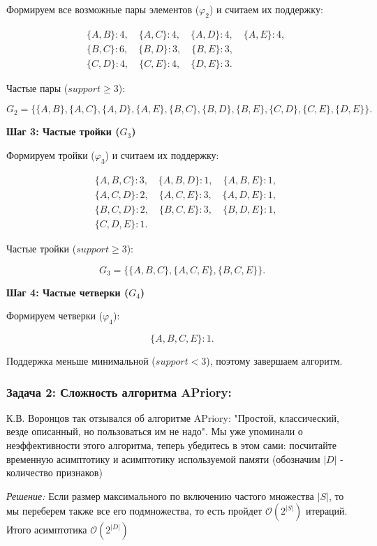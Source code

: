Формируем все возможные пары элементов (\( \varphi_2 \)) и считаем их поддержку:

\[
\begin{aligned}
&\{A, B\}: 4, \quad \{A, C\}: 4, \quad \{A, D\}: 4, \quad \{A, E\}: 4, \\
&\{B, C\}: 6, \quad \{B, D\}: 3, \quad \{B, E\}: 3, \\
&\{C, D\}: 4, \quad \{C, E\}: 4, \quad \{D, E\}: 3.
\end{aligned}
\]

Частые пары (\( support \geq 3 \)):

\[
G_2 = \{\{A, B\}, \{A, C\}, \{A, D\}, \{A, E\}, \{B, C\}, \{B, D\}, \{B, E\}, \{C, D\}, \{C, E\}, \{D, E\}\}.
\]

\textbf{Шаг 3: Частые тройки (\( G_3 \))}

Формируем тройки (\( \varphi_3 \)) и считаем их поддержку:

\[
\begin{aligned}
&\{A, B, C\}: 3, \quad \{A, B, D\}: 1, \quad \{A, B, E\}: 1, \\
&\{A, C, D\}: 2, \quad \{A, C, E\}: 3, \quad \{A, D, E\}: 1, \\
&\{B, C, D\}: 2, \quad \{B, C, E\}: 3, \quad \{B, D, E\}: 1, \\
&\{C, D, E\}: 1.
\end{aligned}
\]

Частые тройки (\( support \geq 3 \)):

\[
G_3 = \{\{A, B, C\}, \{A, C, E\}, \{B, C, E\}\}.
\]

\textbf{Шаг 4: Частые четверки (\( G_4 \))}

Формируем четверки (\( \varphi_4 \)):

\[
\{A, B, C, E\}: 1.
\]

Поддержка меньше минимальной (\( support < 3 \)), поэтому завершаем алгоритм.

\subsubsection{Задача 2: Сложность алгоритма APriory:} К.В. Воронцов так отзывался об алгоритме APriory: "Простой, классический, везде описанный, но пользоваться им не надо". Мы уже упоминали о неэффективности этого алгоритма, теперь убедитесь в этом сами: посчитайте временную асимптотику и асимптотику используемой памяти (обозначим \(|D|\) - количество признаков)


\textit{Решение:} Если размер максимального по включению частого множества \(|S|\), то мы переберем также все его подмножества, то есть пройдет \(\mathcal{O}(2^{|S|})\) итераций. Итого асимптотика \(\mathcal{O}(2^{|D|})\)

